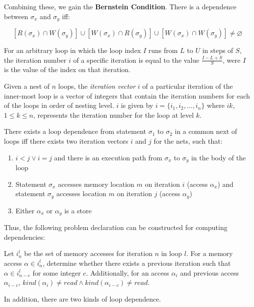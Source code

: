 	Combining these, we gain the \textbf{Bernstein Condition}. There is a dependence between $\sigma_x$ and $\sigma_y$ iff:
	
	\begin{equation} \label{eqn:bernstein}
	\left[ R(\sigma_x) \cap W(\sigma_y) \right] \cup \left[ W(\sigma_x) \cap R(\sigma_y) \right] \cup
	\left[ W(\sigma_x) \cap W(\sigma_y) \right] \neq \varnothing
	\end{equation}
	
	For an arbitrary loop in which the loop index $I$ runs from $L$ to $U$ in steps of $S$, the iteration number $i$ of a specific iteration is equal to the value $\frac{I-L+S}{S}$, were $I$ is the value of the index on that iteration.
	
	Given a nest of $n$ loops, the \textit{iteration vector} $i$ of a particular iteration of the inner-most loop is a vector of integers that contain the iteration numbers for each of the loops in order of nesting level. $i$ is given by $i=\{i_1, i_2, ..., i_n\}$ where $ik$, $1 \leq k \leq n$, represents the iteration number for the loop at level $k$.
	
	There exists a loop dependence from statement $\sigma_1$ to $\sigma_2$ in a common next of loops iff there exists two iteration vectors $i$ and $j$ for the nets, such that:
	
	\begin{enumerate}
		\item $i < j \lor i = j$ and there is an execution path from $\sigma_x$ to $\sigma_y$ in the body of the loop
		\item Statement $\sigma_x$ accesses memory location $m$ on iteration $i$ (access $\alpha_x$) and statement $\sigma_y$ accesses location $m$ on iteration $j$ (access $\alpha_y$)
		\item Either $\alpha_x$ or $\alpha_y$ is a store
	\end{enumerate}
	
	Thus, the following problem declaration can be constructed for computing dependencies:
	
	Let $i^l_n$ be the set of memory accesses for iteration $n$ in loop $l$. For a memory access $\alpha \in i^l_n$, determine whether there exists a previous iteration such that $\alpha \in i^l_{n-c}$ for some integer $c$. Additionally, for an access $\alpha_i$ and previous access $\alpha_{i-c}$, $kind(\alpha_i) \neq read \land kind(\alpha_{i-c}) \neq read$.
	
	In addition, there are two kinds of loop dependence.
	
